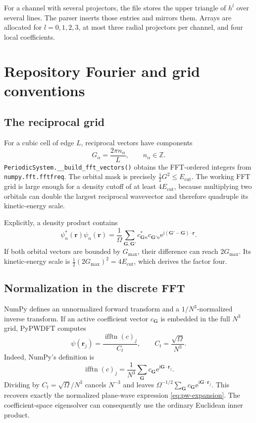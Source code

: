 \documentclass[10pt,twocolumn]{article}
\newcommand{\ii}{\mathrm{i}}
\newcommand{\e}{\mathrm{e}}
\newcommand{\gvec}{\mathbf G}
\newcommand{\rvec}{\mathbf r}
\newcommand{\code}[1]{\texttt{#1}}
\begin{document}
For a channel with several projectors, the file stores the upper triangle of
\(h^l\) over several lines.  The parser inserts those entries and mirrors
them.  Arrays are allocated for \(l=0,1,2,3\), at most three radial
projectors per channel, and four local coefficients.

\section{Repository Fourier and grid conventions}

\subsection{The reciprocal grid}

For a cubic cell of edge \(L\), reciprocal vectors have components
\begin{equation}
G_\alpha=\frac{2\pi n_\alpha}{L},
\qquad n_\alpha\in\mathbb Z.
\end{equation}
\code{PeriodicSystem.\_\_build\_fft\_vectors()} obtains the FFT-ordered
integers from \code{numpy.fft.fftfreq}.  The orbital mask is precisely
\(\tfrac12G^2\le E_{\mathrm{cut}}\).  The working FFT grid is large enough
for a density cutoff of at least \(4E_{\mathrm{cut}}\), because multiplying
two orbitals can double the largest reciprocal wavevector and therefore
quadruple its kinetic-energy scale.

Explicitly, a density product contains
\begin{equation}
\psi_n^*(\rvec)\psi_n(\rvec)
=\frac1\Omega\sum_{\gvec,\gvec'}
c_{\gvec n}^*c_{\gvec'n}
\e^{\ii(\gvec'-\gvec)\cdot\rvec}.
\end{equation}
If both orbital vectors are bounded by \(G_{\max}\), their difference can
reach \(2G_{\max}\).  Its kinetic-energy scale is
\(\tfrac12(2G_{\max})^2=4E_{\mathrm{cut}}\), which derives the factor four.

\subsection{Normalization in the discrete FFT}

NumPy defines an unnormalized forward transform and a \(1/N^3\)-normalized
inverse transform.  If an active coefficient vector \(c_{\gvec}\) is embedded
in the full \(N^3\) grid, PyPWDFT computes
\begin{equation}
\psi(\rvec_j)=
\frac{\operatorname{ifftn}(c)_j}{C_t},
\qquad
C_t=\frac{\sqrt{\Omega}}{N^3}.
\end{equation}
Indeed, NumPy's definition is
\begin{equation}
\operatorname{ifftn}(c)_j
=\frac1{N^3}\sum_\gvec c_\gvec
\e^{\ii\gvec\cdot\rvec_j}.
\end{equation}
Dividing by \(C_t=\sqrt\Omega/N^3\) cancels \(N^{-3}\) and leaves
\(\Omega^{-1/2}\sum_\gvec c_\gvec\e^{\ii\gvec\cdot\rvec_j}\).
This recovers exactly the normalized plane-wave expression
\cref{eq:pw-expansion}.  The coefficient-space eigensolver can consequently
use the ordinary Euclidean inner product.
\end{document}
